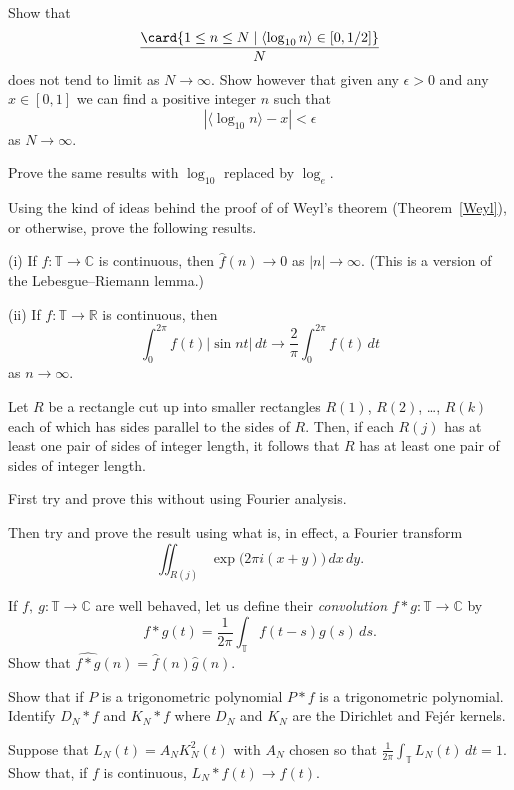\begin{question} Show that
\[\frac{\card\{1\leq n\leq N \mid \langle \log_{10}n\rangle
\in [0,1/2]\}}{N}\]
does not tend to limit as $N\rightarrow\infty$. Show
however that given any $\epsilon>0$ and any $x\in[0,1]$
we can find a positive integer $n$ such that
\[|\langle \log_{10}n\rangle-x|<\epsilon\]
as $N\rightarrow\infty$.

Prove the same results with $\log_{10}$ replaced by $\log_{e}$.
\end{question}
\begin{question} Using the kind of ideas behind
the proof of of Weyl's theorem (Theorem~\ref{Weyl}),
or otherwise, prove the following results.

(i) If $f:{\mathbb T}\rightarrow{\mathbb C}$
is continuous, then $\hat{f}(n)\rightarrow 0$
as $|n|\rightarrow\infty$. (This is a version of
the Lebesgue--Riemann lemma.)

(ii) If $f:{\mathbb T}\rightarrow{\mathbb R}$
is continuous, then
\[\int_{0}^{2\pi}f(t)|\sin nt|\,dt
\rightarrow \frac{2}{\pi}\int_{0}^{2\pi}f(t)\,dt\]
as $n\rightarrow\infty$.
\end{question}
\begin{question} Let $R$ be a rectangle cut up into
smaller rectangles $R(1)$, $R(2)$, \dots, $R(k)$
each of which has sides parallel to the sides of $R$.
Then, if each $R(j)$ has at least one pair of sides
of integer length, it follows that $R$ has
at least one pair of sides of integer length.

First try and prove this without using Fourier analysis.

Then try and prove the result using what is, in effect,
a Fourier transform
\[\iint_{R(j)}\exp\big(2\pi i(x+y)\big)\,dx\,dy.\]
\end{question}
\begin{question}If $f,\ g:{\mathbb T}\rightarrow{\mathbb C}$
are well behaved, let us define their \emph{convolution}
$f*g:{\mathbb T}\rightarrow{\mathbb C}$ by
\[f*g(t)=\frac{1}{2\pi}\int_{\mathbb T}f(t-s)g(s)\,ds.\]
Show that
$\widehat{f*g}(n)=\hat{f}(n)\hat{g}(n)$.

Show that if $P$ is a trigonometric polynomial
$P*f$ is a trigonometric polynomial. Identify
$D_{N}*f$ and $K_{N}*f$ where $D_{N}$ and $K_{N}$
are the Dirichlet and Fej\'{e}r kernels.

Suppose that $L_{N}(t)=A_{N}K_{N}^{2}(t)$ with
$A_{N}$ chosen so that $\frac{1}{2\pi}\int_{\mathbb T}L_{N}(t)\,dt=1$.
Show that, if $f$ is continuous, $L_{N}*f(t)\rightarrow f(t)$.
\end{question}
